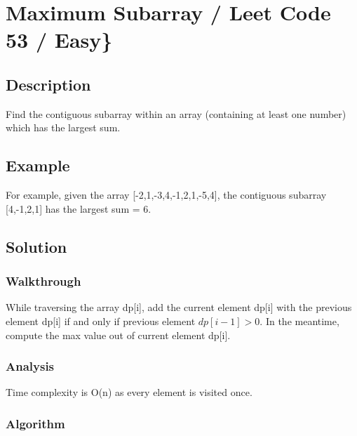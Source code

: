 \documentclass[]{book}
\begin{document}
\hypertarget{maximum-subarray-leet-code-53-easy}{%
\section{Maximum Subarray / Leet Code 53 / Easy\}}\label{maximum-subarray-leet-code-53-easy}}

\hypertarget{description-25}{%
\subsection{Description}\label{description-25}}

Find the contiguous subarray within an array (containing at least one number) which has the largest sum.

\hypertarget{example-24}{%
\subsection{Example}\label{example-24}}

For example, given the array {[}-2,1,-3,4,-1,2,1,-5,4{]}, the contiguous subarray {[}4,-1,2,1{]} has the largest sum = 6.

\hypertarget{solution-19}{%
\subsection{Solution}\label{solution-19}}

\hypertarget{walkthrough-23}{%
\subsubsection{Walkthrough}\label{walkthrough-23}}

While traversing the array dp{[}i{]}, add the current element dp{[}i{]} with the previous element dp{[}i{]} if and only if
previous element \(dp[i-1] > 0\). In the meantime, compute the max value out of current element dp{[}i{]}.

\hypertarget{analysis-26}{%
\subsubsection{Analysis}\label{analysis-26}}

Time complexity is O(n) as every element is visited once.

\hypertarget{algorithm-26}{%
\subsubsection{Algorithm}\label{algorithm-26}}
\end{document}
